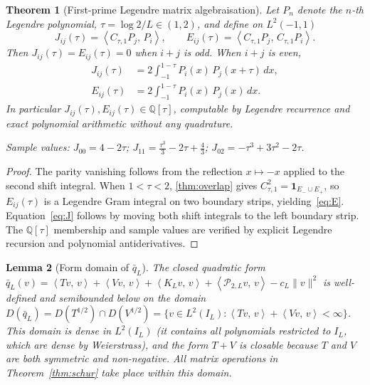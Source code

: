 \documentclass[12pt,a4paper]{amsart}
\theoremstyle{plain}
\newtheorem{theorem}{Theorem}[section]
\newtheorem{lemma}[theorem]{Lemma}
\theoremstyle{definition}
\newcommand{\Q}{\mathbb{Q}}
\newcommand{\qbar}{\bar{q}}
\newcommand{\Ctau}{C_{\tau,1}}
\newcommand{\Eminus}{E_-}
\newcommand{\Eplus}{E_+}
\newcommand{\ip}[2]{\left\langle #1,\, #2\right\rangle}
\newcommand{\Jij}{J_{ij}(\tau)}
\newcommand{\Eij}{E_{ij}(\tau)}
\begin{document}
\begin{theorem}[First-prime Legendre matrix algebraisation]
\label{thm:prime-legendre}
Let $P_n$ denote the $n$-th Legendre polynomial, $\tau = \log 2/L \in (1,2)$,
and define on $L^2(-1,1)$
\[
  \Jij = \ip{\Ctau P_j}{P_i},
  \qquad
  \Eij = \ip{\Ctau P_j}{\Ctau P_i}.
\]
Then $\Jij = \Eij = 0$ when $i+j$ is odd.
When $i+j$ is even,
\begin{align}
  \Jij &= 2\int_{-1}^{1-\tau} P_i(x)\,P_j(x+\tau)\,dx, \label{eq:J}\\
  \Eij &= 2\int_{-1}^{1-\tau} P_i(x)\,P_j(x)\,dx. \label{eq:E}
\end{align}
In particular $\Jij, \Eij \in \Q[\tau]$, computable by Legendre recurrence
and exact polynomial arithmetic without any quadrature.

Sample values: $J_{00} = 4-2\tau$;
$J_{11} = \tfrac{\tau^3}{3} - 2\tau + \tfrac{4}{3}$;
$J_{02} = -\tau^3 + 3\tau^2 - 2\tau$.
\end{theorem}

\begin{proof}
The parity vanishing follows from the reflection $x \mapsto -x$ applied to
the second shift integral.
When $1 < \tau < 2$, \cref{thm:overlap} gives $\Ctau^2 = \mathbf{1}_{\Eminus\cup\Eplus}$,
so $\Eij$ is a Legendre Gram integral on two boundary strips,
yielding~\eqref{eq:E}.
Equation~\eqref{eq:J} follows by moving both shift integrals to the left
boundary strip.
The $\Q[\tau]$ membership and sample values are verified by explicit Legendre
recursion and polynomial antiderivatives.
\end{proof}

\begin{lemma}[Form domain of $\bar{q}_L$]
\label{lem:form-bounded}
The closed quadratic form
$\qbar_L(v) = \ip{Tv}{v} + \ip{Vv}{v} + \ip{K_Lv}{v}
              + \ip{\mathcal{P}_{2,L}v}{v} - c_L\|v\|^2$
is well-defined and semibounded below on the domain
$D(\qbar_L) = D(T^{1/2}) \cap D(V^{1/2})
            = \{v \in L^2(I_L) : \ip{Tv}{v} + \ip{Vv}{v} < \infty\}$.
This domain is dense in $L^2(I_L)$ (it contains all polynomials restricted to $I_L$,
which are dense by Weierstrass), and the form $T+V$ is closable because $T$ and $V$
are both symmetric and non-negative.
All matrix operations in Theorem~\ref{thm:schur} take place within this domain.
\end{lemma}
\end{document}
